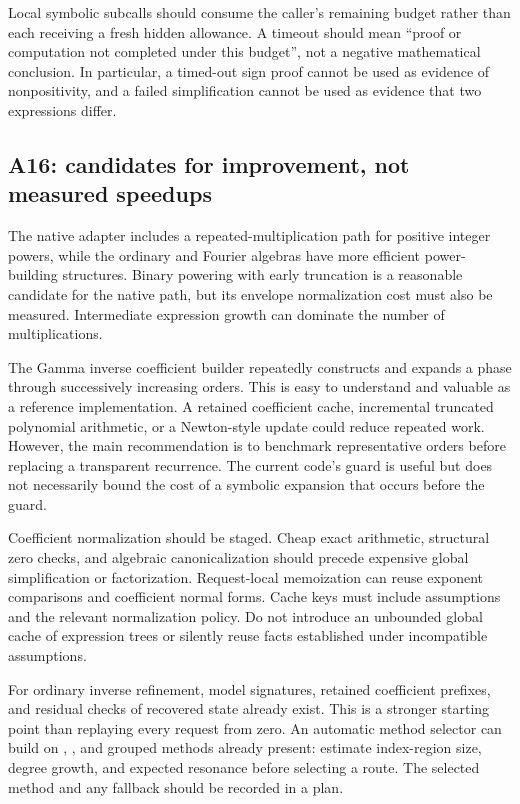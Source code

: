 \documentclass[11pt,a4paper]{article}
\newcommand{\code}[1]{\texttt{\detokenize{#1}}}
\begin{document}
Local symbolic subcalls should consume the caller's remaining budget
rather than each receiving a fresh hidden allowance. A timeout should mean
``proof or computation not completed under this budget'', not a negative
mathematical conclusion. In particular, a timed-out sign proof cannot be
used as evidence of nonpositivity, and a failed simplification cannot be
used as evidence that two expressions differ.

\subsection{A16: candidates for improvement, not measured speedups}
The native adapter includes a repeated-multiplication path for positive
integer powers, while the ordinary and Fourier algebras have more efficient
power-building structures. Binary powering with early truncation is a
reasonable candidate for the native path, but its envelope normalization
cost must also be measured. Intermediate expression growth can dominate the
number of multiplications.
\cite{native,core,fourier}

The Gamma inverse coefficient builder repeatedly constructs and expands a
phase through successively increasing orders. This is easy to understand
and valuable as a reference implementation. A retained coefficient cache,
incremental truncated polynomial arithmetic, or a Newton-style update could
reduce repeated work. However, the main recommendation is to benchmark
representative orders before replacing a transparent recurrence. The
current code's \code{LeafCount} guard is useful but does not necessarily
bound the cost of a symbolic expansion that occurs before the guard.
\cite{gamma}

Coefficient normalization should be staged. Cheap exact arithmetic,
structural zero checks, and algebraic canonicalization should precede
expensive global simplification or factorization. Request-local memoization
can reuse exponent comparisons and coefficient normal forms. Cache keys
must include assumptions and the relevant normalization policy. Do not
introduce an unbounded global cache of expression trees or silently reuse
facts established under incompatible assumptions.

For ordinary inverse refinement, model signatures, retained coefficient
prefixes, and residual checks of recovered state already exist. This is a
stronger starting point than replaying every request from zero. An automatic
method selector can build on \code{Lagrange}, \code{Newton}, and grouped
methods already present: estimate index-region size, degree growth, and
expected resonance before selecting a route. The selected method and any
fallback should be recorded in a plan.
\cite{refinement,core}
\end{document}
